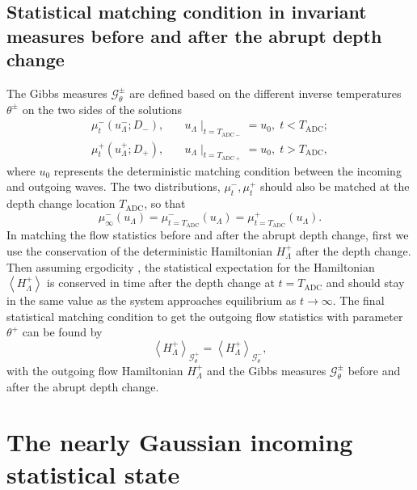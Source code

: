 \documentclass[9pt,twocolumn,twoside,lineno]{pnas-new}
\begin{document}
\subsection{Statistical matching condition in invariant measures before and after the abrupt depth change}

The Gibbs measures $\mathcal{G}_{\theta}^{\pm}$ are defined based
on the different inverse temperatures $\theta^{\pm}$ on the two sides
of the solutions
\[
\begin{aligned}\mu_{t}^{-}\left(u_{\Lambda}^{-};D_{-}\right), & \quad u_{\Lambda}\mid_{t=T_{\mathrm{ADC}-}}=u_{0},\;t<T_{\mathrm{ADC}};\\
\mu_{t}^{+}\left(u_{\Lambda}^{+};D_{+}\right), & \quad u_{\Lambda}\mid_{t=T_{\mathrm{ADC}+}}=u_{0},\;t>T_{\mathrm{ADC}},
\end{aligned}
\]
where $u_{0}$ represents the deterministic matching condition between
the incoming and outgoing waves. The two distributions, $\mu_{t}^{-},\mu_{t}^{+}$
should also be matched at the depth change location $T_{\mathrm{ADC}}$,
so that
\[
\mu_{\infty}^{-}\left(u_{\Lambda}\right)=\mu_{t=T_{\mathrm{ADC}}}^{-}\left(u_{\Lambda}\right)=\mu_{t=T_{\mathrm{ADC}}}^{+}\left(u_{\Lambda}\right).
\]
In matching the flow statistics before and after the abrupt depth
change, first we use the conservation of the deterministic Hamiltonian
$H_{\Lambda}^{+}$ after the depth change. Then assuming ergodicity
\cite{abramov2003hamiltonian,majda2006nonlinear}, the statistical
expectation for the Hamiltonian $\left\langle H_{\Lambda}^{+}\right\rangle $
is conserved in time after the depth change at $t=T_{\mathrm{ADC}}$
and should stay in the same value as the system approaches equilibrium
as $t\rightarrow\infty$. The final statistical matching condition
to get the outgoing flow statistics with parameter $\theta^{+}$ can
be found by
\begin{equation}
\left\langle H_{\Lambda}^{+}\right\rangle _{\mathcal{G}_{\theta}^{+}}=\left\langle H_{\Lambda}^{+}\right\rangle _{\mathcal{G}_{\theta}^{-}},\label{eq:matching}
\end{equation}
with the outgoing flow Hamiltonian $H_{\Lambda}^{+}$ and the Gibbs
measures $\mathcal{G}_{\theta}^{\pm}$ before and after the abrupt
depth change.

\section{The nearly Gaussian incoming statistical state}
\end{document}
